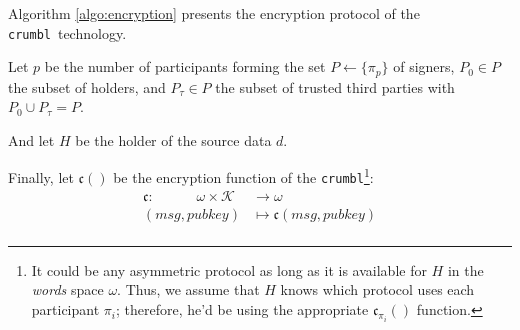 \documentclass[twoside,twocolumn]{article}
\theoremstyle{definition}
\theoremstyle{remark}
\begin{document}
Algorithm \ref{algo:encryption} presents the encryption protocol of the \texttt{crumbl}\textregistered~technology.

\vspace{1em} %

Let $p$ be the number of participants forming the set $P \gets \{ \pi_p\}$ of signers, $P_0 \in P$ the subset of holders, and $P_\tau \in P$ the subset 
of trusted third parties with $P_0 \cup P_\tau = P$.

And let $H$ be the holder of the source data $d$.

Finally, let $\mathfrak{c}()$ be the encryption function of the \texttt{crumbl}\footnote{It could be any asymmetric protocol as long as it is available 
for $H$ in the \emph{words} space $\omega$. Thus, we assume that $H$ knows which protocol uses each participant $\pi_i$; therefore, he'd be using the 
appropriate $\mathfrak{c}_{\pi_i}()$ function.}:
\begin{equation}
    \label{eq:encrypt}
    \begin{array}{rl}
        \mathfrak{c}: \qquad \quad \omega \times \mathcal{K} &\to \omega \\
                (msg, pubkey) &\mapsto \mathfrak{c}(msg, pubkey) \\
    \end{array}
\end{equation}
\end{document}
